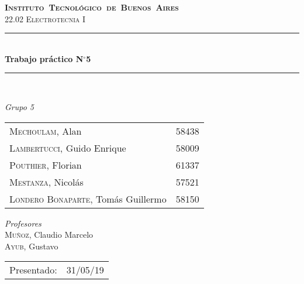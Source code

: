 \begin{titlepage}
\newcommand{\HRule}{\rule{\linewidth}{0.5mm}}
\center
\mbox{\textsc{\LARGE \bfseries {Instituto Tecnológico de Buenos Aires}}}\\[1.5cm]
\textsc{\Large 22.02 Electrotecnia I}\\[0.5cm]


\HRule \\[0.6cm]
{ \Huge \bfseries Trabajo práctico N$^{\circ}$5}\\[0.4cm] 
\HRule \\[1.5cm]


{\large

\emph{Grupo 5}\\
\vspace{3px}

\begin{tabular}{lr} 	
\textsc{Mechoulam}, Alan  &  58438\\
\textsc{Lambertucci}, Guido Enrique  & 58009 \\
\textsc{Pouthier}, Florian  & 61337 \\
\textsc{Mestanza}, Nicolás  & 57521 \\
\textsc{Londero Bonaparte}, Tomás Guillermo  & 58150 \\
\end{tabular}

\vspace{20px}

\emph{Profesores}\\
\vspace{3px}
\textsc{Muñoz}, Claudio Marcelo\\ 	
\textsc{Ayub}, Gustavo\\ 	

\vspace{100px}

\begin{tabular}{ll}

Presentado: & 31/05/19\\

\end{tabular}

}

\vfill

\end{titlepage}
